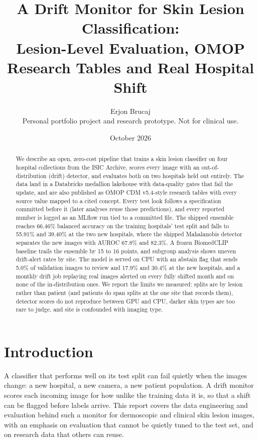 \documentclass[11pt]{article}
\title{A Drift Monitor for Skin Lesion Classification:\\
Lesion-Level Evaluation, OMOP Research Tables and Real Hospital Shift}
\author{Erjon Brucaj\\\small Personal portfolio project and research prototype. Not for clinical use.}
\date{October 2026}
\begin{document}
\maketitle

\begin{abstract}
We describe an open, zero-cost pipeline that trains a skin lesion classifier on four hospital
collections from the ISIC Archive, scores every image with an out-of-distribution (drift)
detector, and evaluates both on two hospitals held out entirely. The data land in a Databricks
medallion lakehouse with data-quality gates that fail the update, and are also published as
OMOP CDM v5.4-style research tables with every source value mapped to a cited concept. Every
test look follows a specification committed before it (later analyses reuse those
predictions), and every reported number is logged as an MLflow run tied to a committed file.
The shipped ensemble reaches 66.46\% balanced accuracy on the training hospitals' test split
and falls to 55.91\% and 39.40\% at the two new hospitals, where the shipped Mahalanobis
detector separates the new images with AUROC 67.8\% and 82.3\%. A frozen BiomedCLIP baseline
trails the ensemble by 15 to 16 points, and subgroup analysis shows uneven drift-alert rates by
site. The model is served on CPU with an abstain flag that sends 5.0\% of validation images to
review and 17.9\% and 30.4\% at the new hospitals, and a monthly drift job replaying real images
alerted on every fully shifted month and on none of the in-distribution ones.
We report the limits we measured: splits are by lesion rather than patient (and patients do
span splits at the one site that records them), detector
scores do not reproduce between GPU and CPU, darker skin types are too rare to judge, and site
is confounded with imaging type.
\end{abstract}

\section{Introduction}
A classifier that performs well on its test split can fail quietly when the images change:
a new hospital, a new camera, a new patient population. A drift monitor scores each incoming
image for how unlike the training data it is, so that a shift can be flagged before labels
arrive. This report covers the data engineering and evaluation behind such a monitor for
dermoscopic and clinical skin lesion images, with an emphasis on evaluation that cannot be
quietly tuned to the test set, and on research data that others can reuse.
\end{document}
